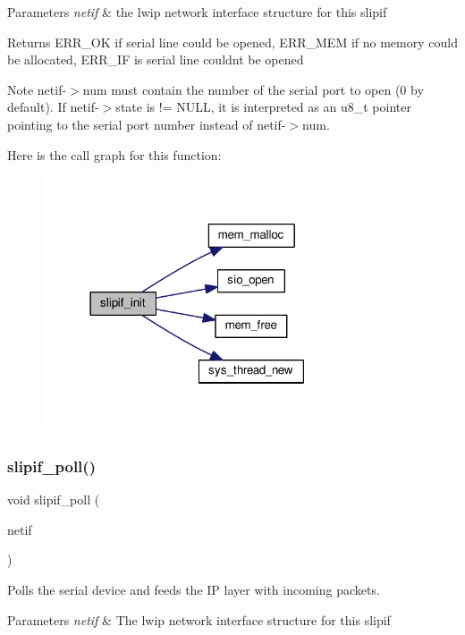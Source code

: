 \begin{DoxyParams}{Parameters}
{\em netif} & the lwip network interface structure for this slipif \\
\hline
\end{DoxyParams}
\begin{DoxyReturn}{Returns}
E\+R\+R\+\_\+\+OK if serial line could be opened, E\+R\+R\+\_\+\+M\+EM if no memory could be allocated, E\+R\+R\+\_\+\+IF is serial line couldn\textquotesingle{}t be opened
\end{DoxyReturn}
\begin{DoxyNote}{Note}
netif-\/$>$num must contain the number of the serial port to open (0 by default). If netif-\/$>$state is != N\+U\+LL, it is interpreted as an u8\+\_\+t pointer pointing to the serial port number instead of netif-\/$>$num. 
\end{DoxyNote}
Here is the call graph for this function\+:
\nopagebreak
\begin{figure}[H]
\begin{center}
\leavevmode
\includegraphics[width=259pt]{openmote-cc2538_2lwip_2src_2netif_2slipif_8c_a687973ba82dab13a5b9d38d7399aeee3_cgraph}
\end{center}
\end{figure}
\mbox{\label{openmote-cc2538_2lwip_2src_2netif_2slipif_8c_a7b036fd1cde9b299139cac62f52d15a6}} 
\subsubsection{\texorpdfstring{slipif\+\_\+poll()}{slipif\_poll()}}
{\footnotesize\ttfamily void slipif\+\_\+poll (\begin{DoxyParamCaption}\item[{struct \hyperlink{structnetif}{netif} $\ast$}]{netif }\end{DoxyParamCaption})}

Polls the serial device and feeds the IP layer with incoming packets.


\begin{DoxyParams}{Parameters}
{\em netif} & The lwip network interface structure for this slipif \\
\hline
\end{DoxyParams}
